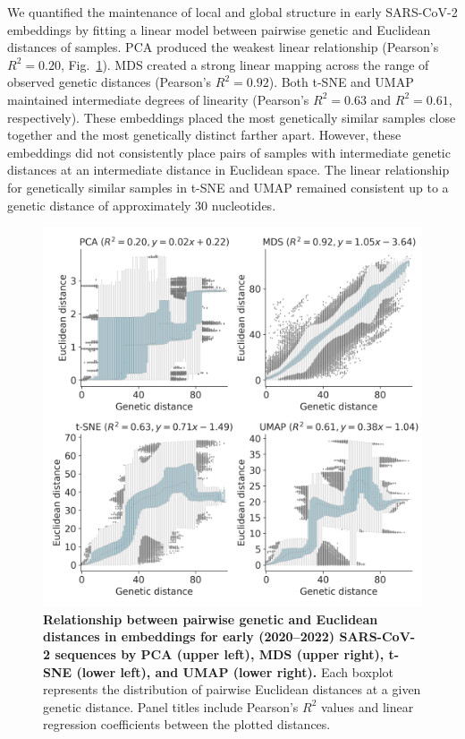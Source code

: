 \documentclass[10pt,letterpaper]{article}
\begin{document}
We quantified the maintenance of local and global structure in early SARS-CoV-2 embeddings by fitting a linear model between pairwise genetic and Euclidean distances of samples.
PCA produced the weakest linear relationship (Pearson's $R^{2}=0.20$, Fig.~\ref{fig:sars-cov-2-pairwise-distances}).
MDS created a strong linear mapping across the range of observed genetic distances (Pearson's $R^{2}=0.92$).
Both t-SNE and UMAP maintained intermediate degrees of linearity (Pearson's $R^{2}=0.63$ and $R^{2}=0.61$, respectively).
These embeddings placed the most genetically similar samples close together and the most genetically distinct farther apart.
However, these embeddings did not consistently place pairs of samples with intermediate genetic distances at an intermediate distance in Euclidean space.
The linear relationship for genetically similar samples in t-SNE and UMAP remained consistent up to a genetic distance of approximately 30 nucleotides.

\begin{figure}[!h]
\includegraphics[width=\columnwidth]{figures/sarscov2-euclidean-distance-by-genetic-distance.png}
\caption{{\bf Relationship between pairwise genetic and Euclidean distances in embeddings for early (2020--2022) SARS-CoV-2 sequences by PCA (upper left), MDS (upper right), t-SNE (lower left), and UMAP (lower right).}
  Each boxplot represents the distribution of pairwise Euclidean distances at a given genetic distance.
  Panel titles include Pearson's $R^{2}$ values and linear regression coefficients between the plotted distances.
}
\label{fig:sars-cov-2-pairwise-distances}
\end{figure}
\end{document}
